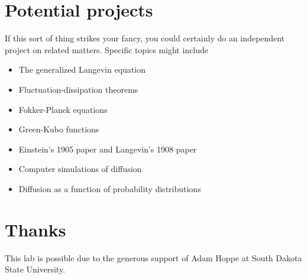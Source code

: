\documentclass[12pt]{article}
\begin{document}
\pagebreak
\section{Potential projects}
If this sort of thing strikes your fancy, you could certainly do an
independent project on related matters. Specific topics might include

\begin{itemize}
\item The generalized Langevin equation
\item Fluctuation-dissipation theorems
\item Fokker-Planck equations
\item Green-Kubo functions
\item Einstein's 1905 paper and Langevin's 1908 paper
\item Computer simulations of diffusion
\item Diffusion as a function of probability distributions
\end{itemize}



\section{Thanks}
 This lab is possible due to the
  generous support of Adam Hoppe at South Dakota State University.


\end{document}
